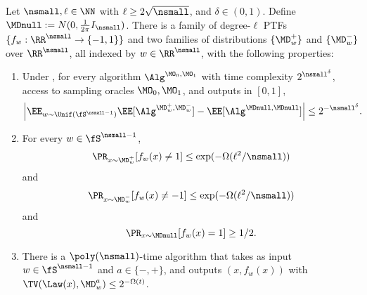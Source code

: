 \begin{lemma}\label{lemma:ptf-distributions}
Let $\nsmall,\ell \in\NN$ with $\ell \geq 2\sqrt{\nsmall}$, and $\delta \in (0,1)$. Define $\MDnull := N(0, \frac{1}{2\pi} I_{\nsmall})$. There is a family of degree-$\ell$ PTFs $\{f_w: \RR^{\nsmall} \to \{-1,1\}\}$ and two families of distributions $\{\MD_w^+\}$ and $\{\MD_w^-\}$ over $\RR^{\nsmall}$, all indexed by $w \in \RR^{\nsmall}$, with the following properties:
\begin{enumerate}
\item\label{item:indist} Under \cite[Assumption 3.4]{tiegel2023hardness}, for every algorithm $\Alg^{\MO_0,\MO_1}$ with time complexity $2^{\nsmall^\delta}$, access to sampling oracles $\MO_0,\MO_1$, and outputs in $[0,1]$,
\[\left|\EE_{w \sim \Unif(\fS^{\nsmall-1})} \EE[\Alg^{\MD_w^+,\MD_w^-}] - \EE[\Alg^{\MDnull,\MDnull}]\right| \leq 2^{-\nsmall^\delta}.\]
\item For every $w \in \fS^{\nsmall-1}$,
\begin{equation} \Pr_{x \sim \MD_w^+}[f_w(x) \neq 1] \leq \exp(-\Omega(\ell^2/\nsmall))\label{eq:misspec-plus}\end{equation}
and
\begin{equation} \Pr_{x \sim \MD_w^-}[f_w(x) \neq -1] \leq \exp(-\Omega(\ell^2/\nsmall))\label{eq:misspec-minus}\end{equation}
and
\begin{equation} \Pr_{x \sim \MDnull}[f_w(x) = 1] \geq 1/2.\label{eq:null-bias}
\end{equation}
\item\label{item:samp} There is a $\poly(\nsmall)$-time algorithm that takes as input $w \in \fS^{\nsmall-1}$ and $a \in \{-,+\}$, and outputs $(x,f_w(x))$ with $\TV(\Law(x),\MD_w^a) \leq 2^{-\Omega(t)}$.
\end{enumerate}
\end{lemma}


